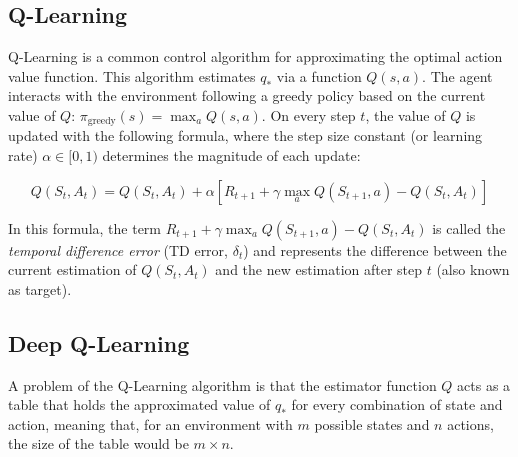 


\subsection{Q-Learning}

Q-Learning \cite{Watkins:1992} is a common control algorithm for approximating the optimal action value function. This algorithm estimates $q_\ast$ via a function $Q(s,a)$. The agent interacts with the environment following a greedy policy based on the current value of $Q$: $\pi_\textrm{greedy}(s) = \max_a Q(s,a)$. On every step $t$, the value of $Q$ is updated with the following formula, where the step size constant (or learning rate) $\alpha \in [0,1)$ determines the magnitude of each update:

\begin{equation}
    Q(S_t,A_t) = Q(S_t,A_t) + \alpha[R_{t+1} + \gamma \max_a Q(S_{t+1},a) - Q(S_t,A_t)]
\end{equation}

In this formula, the term $R_{t+1} + \gamma \max_a Q(S_{t+1},a) - Q(S_t,A_t)$ is called the \textit{temporal difference error} (TD error, $\delta_t$) and represents the difference between the current estimation of $Q(S_t,A_t)$ and the new estimation after step $t$ (also known as target).

\subsection{Deep Q-Learning}

A problem of the Q-Learning algorithm is that the estimator function $Q$ acts as a table that holds the approximated value of $q_\ast$ for every combination of state and action, meaning that, for an environment with $m$ possible states and $n$ actions, the size of the table would be $m \times n$. 

